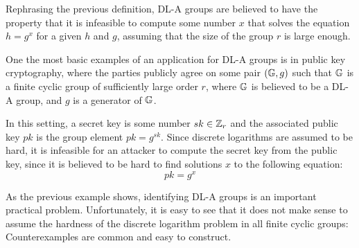 Rephrasing the previous definition, DL-A groups are believed to have the property that it is infeasible to compute some number $x$ that solves the equation $h=g^x$ for a given $h$ and $g$, assuming that the size of the group $r$ is large enough.
\begin{example}
One the most basic examples of an application for DL-A groups is in public key cryptography, where the parties publicly agree on some pair $(\mathbb{G},g)$  such that $\mathbb{G}$ is a finite cyclic group of sufficiently large order $r$, where $\mathbb{G}$ is believed to be a DL-A group, and $g$ is a generator of $\mathbb{G}$.

In this setting, a secret key is some number $sk\in \mathbb{Z}_r$ and the associated public key $pk$ is the group element $pk=g^{sk}$. Since discrete logarithms are assumed to be hard, it is infeasible for an attacker to compute the secret key from the public key, since it is believed to be hard to find solutions $x$ to the following equation:
\begin{equation}
pk = g^{x}
\end{equation}
\end{example}
As the previous example shows, identifying DL-A groups is an important practical problem. Unfortunately, it is easy to see that it does not make sense to assume the hardness of the discrete logarithm problem in all finite cyclic groups: Counterexamples are common and easy to construct.
